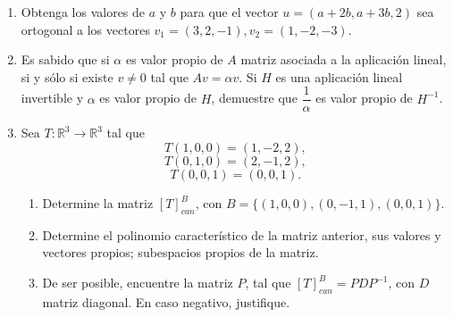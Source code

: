 \documentclass[12pt]{article}
\theoremstyle{exampstyle}
\theoremstyle{definition}
\theoremstyle{break}
\numberwithin{equation}{section}
\begin{document}
\begin{enumerate}

\item Obtenga los valores de $a$ y $b$ para que el vector  $u=(a+2b,a+3b,2)$ sea ortogonal a los vectores $v_1=(3,2,-1), v_2=(1,-2,-3) .$

 \item Es sabido que si $\alpha$ es valor propio de $A$ matriz asociada a la aplicación lineal, si y s\'olo si existe $v\neq 0$ tal que $Av=\alpha v$.
Si $H$ es una aplicación lineal invertible y $\alpha$ es valor propio de $H$, demuestre que $\dfrac{1}{\alpha}$ es valor propio de $H^{-1}$.


\item  Sea $T:\mathbb{R}^3\to \mathbb{R}^3$ tal que \\
$$T(1,0,0)=(1,-2,2),$$
$$T(0,1,0)=(2,-1,2),$$
$$T(0,0,1)=(0,0,1).$$
\begin{enumerate}
    \item Determine la matriz $[T]_{can}^B$, con $B=\{(1,0,0),(0,-1,1),(0,0,1)\}$.
\item Determine el polinomio caracter\'istico de la matriz anterior, sus valores y  vectores propios; subespacios propios de la matriz.
\item De ser posible, encuentre la matriz $P$, tal que $[T]_{can}^B=PDP^{-1}$, con $D$ matriz diagonal. En caso negativo, justifique.
\end{enumerate}



 
\end{enumerate}
\end{document}
